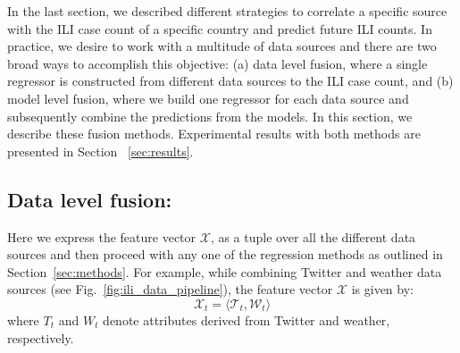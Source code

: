 %
%

In the last section, we described different strategies to correlate a
specific source with the ILI case count of a specific country and predict
future ILI counts.  In practice, we desire to work with a multitude of
data sources and there are two broad ways to accomplish this objective:
(a) data level fusion, where a single regressor is constructed from different
data sources to the ILI case count, and (b) model level fusion, where we
build one regressor for each data source and subsequently combine the
predictions from the models. In this section, we describe these fusion
methods. Experimental results with both methods are presented in Section
~\ref{sec:results}.

\vspace{-1em}
\subsection{\label{sec:fusion:data} Data level fusion:}
Here we express the feature vector $\mathcal{X}$, as a tuple over all the different data 
sources and then proceed with any one of the regression methods as outlined in Section~\ref{sec:methods}.
For example, while combining Twitter and weather data sources (see Fig.~\ref{fig:ili_data_pipeline}), the 
feature vector $\mathcal{X}$ is given by:
\[\mathcal{X}_t = \langle \mathcal{T}_t, \mathcal{W}_t \rangle
\]
where $T_t$ and $W_t$ denote attributes derived from Twitter and weather, respectively.

\vspace{-1em}
